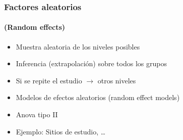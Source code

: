 \documentclass[mathserif]{beamer}
\begin{document}
 
\begin{frame}[label=encours]
   \frametitle{Factores aleatorios}
   \framesubtitle{(Random effects)}
    \begin{itemize}
         \item Muestra aleatoria de los niveles posibles
         \item Inferencia (extrapolaci\'on) sobre todos los grupos
         \item Si se repite el estudio $\rightarrow$ otros niveles
         \item Modelos de efectos aleatorios (random effect models)
         \item Anova tipo II
         \item Ejemplo: Sitios de estudio, \ldots
   \end{itemize}
\end{frame}%
\end{document}
